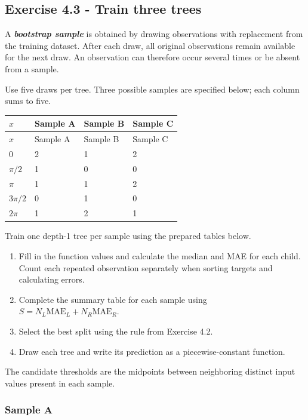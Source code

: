 \documentclass[10pt]{article}
\begin{document}
\par\endgroup

\subsection*{Exercise 4.3 - Train three trees}
A \textbf{\textit{bootstrap sample}} is obtained by drawing observations with replacement from the training dataset. After each draw, all original observations remain available for the next draw. An observation can therefore occur several times or be absent from a sample.

Use five draws per tree. Three possible samples are specified below; each column sums to five.

\begingroup
\small
\setlength{\tabcolsep}{4pt}
\begin{longtable}{l|l|l|l}
$x$ & Sample A & Sample B & Sample C \\
\hline
\endfirsthead
$x$ & Sample A & Sample B & Sample C \\
\hline
\endhead
$0$ & 2 & 1 & 2 \\[1.5pt]
$\pi/2$ & 1 & 0 & 0 \\[1.5pt]
$\pi$ & 1 & 1 & 2 \\[1.5pt]
$3\pi/2$ & 0 & 1 & 0 \\[1.5pt]
$2\pi$ & 1 & 2 & 1 \\[1.5pt]
\end{longtable}
\endgroup
Train one depth-1 tree per sample using the prepared tables below.

\begin{enumerate}
\item
Fill in the function values and calculate the median and MAE for each child. Count each repeated observation separately when sorting targets and calculating errors.

\item
Complete the summary table for each sample using $S=N_L\mathrm{MAE}_L+N_R\mathrm{MAE}_R$.

\item
Select the best split using the rule from Exercise 4.2.

\item
Draw each tree and write its prediction as a piecewise-constant function.

\end{enumerate}
The candidate thresholds are the midpoints between neighboring distinct input values present in each sample.

\subsubsection*{Sample A}
\end{document}
